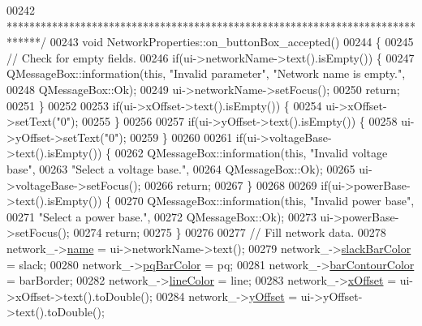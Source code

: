 \begin{DoxyCode}
{{{{{{{{{{{{{{{{00242 \textcolor{comment}{ ******************************************************************************/}
00243 \textcolor{keywordtype}{void} NetworkProperties::on\_buttonBox\_accepted()
00244 \{
00245   \textcolor{comment}{// Check for empty fields.}
00246   \textcolor{keywordflow}{if}(ui->networkName->text().isEmpty()) \{
00247     QMessageBox::information(\textcolor{keyword}{this}, \textcolor{stringliteral}{"Invalid parameter"}, \textcolor{stringliteral}{"Network name is empty."},
00248                              QMessageBox::Ok);
00249     ui->networkName->setFocus();
00250     \textcolor{keywordflow}{return};
00251   \}
00252 
00253   \textcolor{keywordflow}{if}(ui->xOffset->text().isEmpty()) \{
00254     ui->xOffset->setText(\textcolor{stringliteral}{"0"});
00255   \}
00256 
00257   \textcolor{keywordflow}{if}(ui->yOffset->text().isEmpty()) \{
00258     ui->yOffset->setText(\textcolor{stringliteral}{"0"});
00259   \}
00260 
00261   \textcolor{keywordflow}{if}(ui->voltageBase->text().isEmpty()) \{
00262     QMessageBox::information(\textcolor{keyword}{this}, \textcolor{stringliteral}{"Invalid voltage base"},
00263                              \textcolor{stringliteral}{"Select a voltage base."},
00264                              QMessageBox::Ok);
00265     ui->voltageBase->setFocus();
00266     \textcolor{keywordflow}{return};
00267   \}
00268 
00269   \textcolor{keywordflow}{if}(ui->powerBase->text().isEmpty()) \{
00270     QMessageBox::information(\textcolor{keyword}{this}, \textcolor{stringliteral}{"Invalid power base"},
00271                              \textcolor{stringliteral}{"Select a power base."},
00272                              QMessageBox::Ok);
00273     ui->powerBase->setFocus();
00274     \textcolor{keywordflow}{return};
00275   \}
00276 
00277   \textcolor{comment}{// Fill network data.}
00278   network\_->\hyperlink{class_network_ab6643733a517f930c60b06f5ffd78186}{name} = ui->networkName->text();
00279   network\_->\hyperlink{class_network_ac6c44cb1f88cd67a4fab7eff948e2d1d}{slackBarColor} = slack;
00280   network\_->\hyperlink{class_network_a610c48c9e2dd9555f9b354ab72fb96cc}{pqBarColor} = pq;
00281   network\_->\hyperlink{class_network_a20c58a0630bdbbade527d55ba48d924c}{barContourColor} = barBorder;
00282   network\_->\hyperlink{class_network_a453db7f1a994603fe4d38ac5899eb09c}{lineColor} = line;
00283   network\_->\hyperlink{class_network_a9f5c70be28a45320802bd0ac3947d114}{xOffset} = ui->xOffset->text().toDouble();
00284   network\_->\hyperlink{class_network_a771b16f7eb4459d0ca7141c048b1ab59}{yOffset} = ui->yOffset->text().toDouble();
}}}}}}}}}}}}}}}}
\end{DoxyCode}
